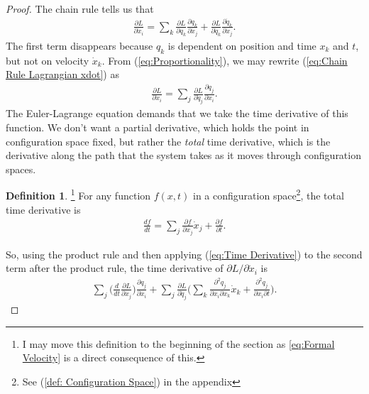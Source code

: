 \documentclass[10pt, psamsfonts]{amsart}
\theoremstyle{definition}
\newtheorem{defn}[thm]{Definition}
\theoremstyle{remark}
\numberwithin{equation}{section}
\begin{document}
\begin{proof}
The chain rule tells us that
\begin{align}
  \label{eq:Chain Rule Lagrangian xdot} 
  \frac{\partial L}{\partial \dot{x}_i}  = \sum_k \frac{\partial L}{\partial q_k} \frac{\partial q_k}{\partial \dot{x}_j} + \frac{\partial L}{\partial \dot{q}_k} \frac{\partial \dot{q}_k}{\partial \dot{x}_j}.
\end{align}
The first term disappears because $q_k$ is dependent on position and time $x_k$ and $t$, but not on velocity $\dot{x}_k$. From (\ref{eq:Proportionality}), we may rewrite (\ref{eq:Chain Rule Lagrangian xdot}) as
\begin{align*}
  \frac{\partial L}{\partial \dot{x}_i} = \sum_j \frac{\partial L}{\partial \dot{q}_j} \frac{\partial q_j}{\partial x_i}. 
\end{align*}
The Euler-Lagrange equation demands that we take the time derivative of this function. We don't want a partial derivative, which holds the point in configuration space fixed, but rather the \textit{total} time derivative, which is the derivative along the path that the system takes as it moves through configuration spaces.

\begin{defn}\footnote{I may move this definition to the beginning of the section as \ref{eq:Formal Velocity} is a direct consequence of this.}
For any function $f(x,t)$ in a configuration space\footnote{See (\ref{def: Configuration Space}) in the appendix}, the total time derivative is
\begin{align}
  \label{eq:Time Derivative}
  \frac{df}{dt} = \sum_j \frac{\partial f}{\partial x_j} \dot{x}_j + \frac{\partial f}{\partial t}. 
\end{align}
\end{defn}
\noindent So, using the product rule and then applying (\ref{eq:Time Derivative}) to the second term after the product rule, the time derivative of $\partial L/\partial \dot{x}_i$ is
\begin{align}
  \label{eq:Time Derivative Lagrangian}
  \sum_j \bigg(\frac{d}{dt} \frac{\partial L}{\partial \dot{x}_j}  \bigg) \frac{\partial q_j}{\partial x_i} + \sum_j \frac{\partial L}{\partial \dot{q}_j} \bigg(\sum_{k} \frac{\partial^2 q_j}{\partial x_i \partial x_k} \dot{x}_k + \frac{\partial^2 q_j}{\partial x_i \partial t}  \bigg).
\end{align}


\end{proof}
\end{document}
